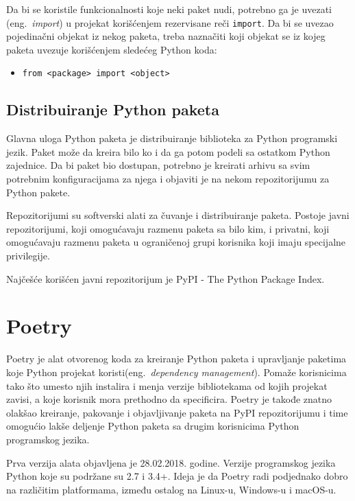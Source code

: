 \documentclass[12pt]{report}
\begin{document}
Da bi se koristile funkcionalnosti koje neki paket nudi, potrebno ga je uvezati (eng.\ \textit{import}) u projekat korišćenjem rezervisane reči \texttt{import}. Da bi se uvezao pojedinačni objekat iz nekog paketa, treba naznačiti koji objekat se iz kojeg paketa uvezuje korišćenjem sledećeg Python koda:

\begin{itemize}
    \item \texttt{from <package> import <object>}
\end{itemize}

\subsection{Distribuiranje Python paketa}

Glavna uloga Python paketa je distribuiranje biblioteka za Python programski jezik. Paket može da kreira bilo ko i da ga potom podeli sa ostatkom Python zajednice. Da bi paket bio dostupan, potrebno je kreirati arhivu sa svim potrebnim konfiguracijama za njega i objaviti je na nekom repozitorijumu za Python pakete.

Repozitorijumi su softverski alati za čuvanje i distribuiranje paketa. Postoje javni repozitorijumi, koji omogućavaju razmenu paketa sa bilo kim, i privatni, koji omogućavaju razmenu paketa u ograničenoj grupi korisnika koji imaju specijalne privilegije.

Najčešće korišćen javni repozitorijum je PyPI \cite{pypi}  - The Python Package Index.

\section{Poetry}
Poetry \cite{poetry} je alat otvorenog koda za kreiranje Python paketa i upravljanje paketima koje Python projekat koristi(eng.\ \textit{dependency management}). Pomaže korisnicima tako što umesto njih instalira i menja verzije  bibliotekama od kojih projekat zavisi, a koje korisnik mora prethodno da specificira. Poetry je takođe znatno olakšao kreiranje, pakovanje i objavljivanje paketa na PyPI repozitorijumu i time omogućio lakše deljenje Python paketa sa drugim korisnicima Python programskog jezika.

Prva verzija alata objavljena je 28.02.2018. godine. Verzije programskog jezika Python koje su podržane su 2.7 i 3.4+. Ideja je da Poetry radi podjednako dobro na različitim platformama, između ostalog na Linux-u, Windows-u i macOS-u.
\end{document}

